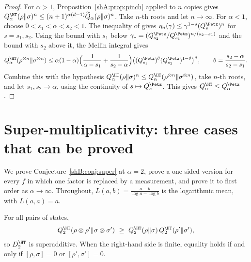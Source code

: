 \begin{proof}
For $\alpha>1$, Proposition~\ref{shA:prop:pinch} applied to $n$ copies gives $Q^\HT_\alpha(\rho\|\sigma)^n\le(n+1)^{\alpha(d-1)}\widetilde Q_\alpha(\rho\|\sigma)^n$. Take $n$-th roots and let $n\to\infty$. For $\alpha<1$, choose $0<s_1<\alpha<s_2<1$. The inequality of \cite{AudenaertChernoff2007} gives $\eta_n(\gamma)\le\gamma^{1-s}(Q^\Petz_s)^n$ for $s=s_1,s_2$. Using the bound with $s_1$ below $\gamma_*=(Q^\Petz_{s_2}/Q^\Petz_{s_1})^{n/(s_2-s_1)}$ and the bound with $s_2$ above it, the Mellin integral gives
\[
Q^\HT_\alpha(\rho^{\otimes n}\|\sigma^{\otimes n})\le\alpha(1-\alpha)\Big(\frac{1}{\alpha-s_1}+\frac{1}{s_2-\alpha}\Big)\big((Q^\Petz_{s_1})^{\theta}(Q^\Petz_{s_2})^{1-\theta}\big)^n,\qquad \theta=\frac{s_2-\alpha}{s_2-s_1}.
\]
Combine this with the hypothesis $Q^\HT_\alpha(\rho\|\sigma)^n\le Q^\HT_\alpha(\rho^{\otimes n}\|\sigma^{\otimes n})$, take $n$-th roots, and let $s_1,s_2\to\alpha$, using the continuity of $s\mapsto Q^\Petz_s$. This gives $Q^\HT_\alpha\le Q^\Petz_\alpha$.
\end{proof}

\section{Super-multiplicativity: three cases that can be proved}\label{shB:sec:three}

We prove Conjecture~\ref{shB:conj:super} at $\alpha=2$, prove a one-sided version for every $f$ in which one factor is replaced by a measurement, and prove it to first order as $\alpha\to\infty$. Throughout, $L(a,b)=\frac{a-b}{\log a-\log b}$ is the logarithmic mean, with $L(a,a)=a$.

\begin{theorem}[Super-multiplicativity at $\alpha=2$]\label{shB:thm:super2}
For all pairs of states,
\[
Q^\HT_2(\rho\otimes\rho'\|\sigma\otimes\sigma')\ \ge\ Q^\HT_2(\rho\|\sigma)\,Q^\HT_2(\rho'\|\sigma'),
\]
so $D^\HT_2$ is superadditive. When the right-hand side is finite, equality holds if and only if $[\rho,\sigma]=0$ or $[\rho',\sigma']=0$.
\end{theorem}

